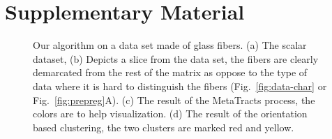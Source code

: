 \pagebreak
\clearpage
\section{Supplementary Material}
\label{sec:sm}

\begin{figure}
\centering
{}
  \caption{Our algorithm on a data set made of glass fibers. (a) The scalar dataset, (b) Depicts a slice from the data set, the  fibers are clearly demarcated from the rest of the matrix as oppose to the type of data  where it is hard to distinguish the fibers (Fig.~\ref{fig:data-char} or Fig.~\ref{fig:prepreg}A). (c) The result of the MetaTracts process, the colors are to help visualization. (d) The result of the orientation based clustering, the two clusters are marked red and yellow.}\label{fig:glass}
\end{figure}
